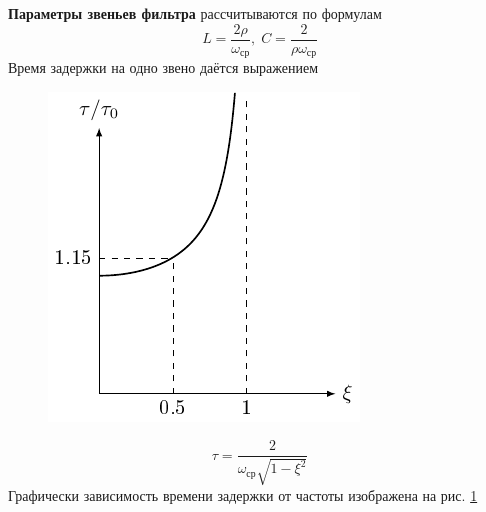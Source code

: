 \textbf{Параметры звеньев фильтра} рассчитываются по формулам
\begin{equation}
	\label{eq:5.5}
	L=\frac{2\rho}{\omega_{\text{ср}}},\;
	C=\frac{2}{\rho\omega_{\text{ср}}}
\end{equation}
Время задержки на одно звено даётся выражением
\begin{figure}[H]
	\centering
	\includegraphics[]{chem/FLF/tau1.pdf}
	\caption{}
	\label{fig:1.4}
\end{figure}
\begin{equation}
\label{eq:5.6}
\tau=\frac{2}{\omega_{\text{ср}}\sqrt{1-\xi^2}}
\end{equation}
Графически зависимость времени задержки от частоты изображена на рис. \ref{fig:1.4}
